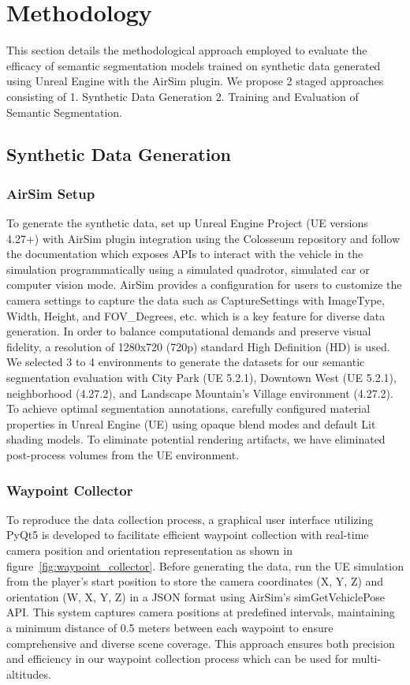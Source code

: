 \documentclass[../report.tex]{subfiles}
\begin{document}
    \section{Methodology}
    \label{sec:methodology}
    This section details the methodological approach employed to evaluate the efficacy of semantic segmentation models trained on synthetic data generated using Unreal Engine with the AirSim plugin. 
    We propose 2 staged approaches consisting of 1. Synthetic Data Generation 2. Training and Evaluation of Semantic Segmentation. 
    
    \subsection{Synthetic Data Generation}
    \subsubsection{AirSim Setup}
    To generate the synthetic data, set up Unreal Engine Project (UE versions 4.27+) with AirSim plugin integration using the Colosseum repository \cite{colosseumgithub} and follow the documentation \cite{airsimdoc} which exposes APIs to interact with the vehicle in the simulation programmatically using a simulated quadrotor, simulated car or computer vision mode.
    AirSim provides a configuration for users to customize the camera settings to capture the data such as CaptureSettings with ImageType, Width, Height, and FOV\_Degrees, etc. which is a key feature for diverse data generation. 
    In order to balance computational demands and preserve visual fidelity, a resolution of 1280x720 (720p) standard High Definition (HD) is used. We selected 3 to 4 environments to generate the datasets for our semantic segmentation evaluation with City Park (UE 5.2.1), Downtown West (UE 5.2.1), neighborhood (4.27.2), and Landscape Mountain's Village environment (4.27.2). 
    To achieve optimal segmentation annotations, carefully configured material properties in Unreal Engine (UE) using opaque blend modes and default Lit shading models. To eliminate potential rendering artifacts, we have eliminated post-process volumes from the UE environment.
    
    \subsubsection{Waypoint Collector}
    To reproduce the data collection process, a graphical user interface utilizing PyQt5 is developed to facilitate efficient waypoint collection with real-time camera position and orientation representation as shown in figure~\ref{fig:waypoint_collector}. Before generating the data, run the UE simulation from the player's start position to store the camera coordinates (X, Y, Z) and orientation (W, X, Y, Z) in a JSON format using AirSim's simGetVehiclePose API.
    This system captures camera positions at predefined intervals, maintaining a minimum distance of 0.5 meters between each waypoint to ensure comprehensive and diverse scene coverage. This approach ensures both precision and efficiency in our waypoint collection process which can be used for multi-altitudes.
    
\end{document}
